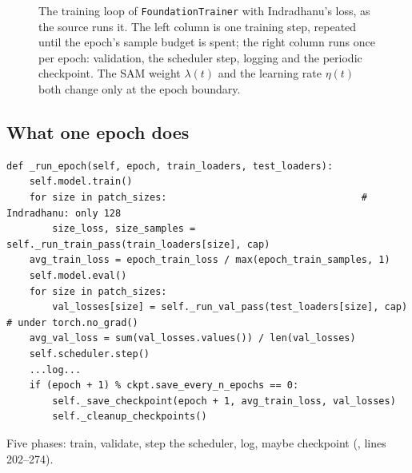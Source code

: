 \begin{figure}[htbp]
\caption{The training loop of \texttt{FoundationTrainer} with Indradhanu's loss, as the source runs
it. The left column is one training step, repeated until the epoch's sample budget is spent;
the right column runs once per epoch: validation, the scheduler step, logging and the periodic
checkpoint. The SAM weight $\lambda(t)$ and the learning rate $\eta(t)$ both change only at the
epoch boundary.}
\label{fig:trainloop:flow}
\end{figure}


\subsection{What one epoch does}

\begin{lstlisting}
def _run_epoch(self, epoch, train_loaders, test_loaders):
    self.model.train()
    for size in patch_sizes:                                  # Indradhanu: only 128
        size_loss, size_samples = self._run_train_pass(train_loaders[size], cap)
    avg_train_loss = epoch_train_loss / max(epoch_train_samples, 1)
    self.model.eval()
    for size in patch_sizes:
        val_losses[size] = self._run_val_pass(test_loaders[size], cap)   # under torch.no_grad()
    avg_val_loss = sum(val_losses.values()) / len(val_losses)
    self.scheduler.step()
    ...log...
    if (epoch + 1) % ckpt.save_every_n_epochs == 0:
        self._save_checkpoint(epoch + 1, avg_train_loss, val_losses)
        self._cleanup_checkpoints()
\end{lstlisting}
Five phases: train, validate, step the scheduler, log, maybe checkpoint
(, lines 202--274).

